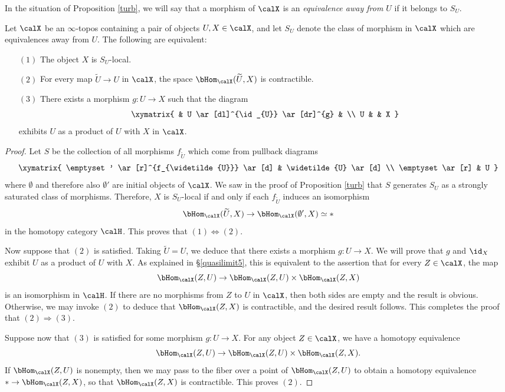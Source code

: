 In the situation of Proposition \ref{turb}, we will say that a morphism of $\calX$ is an {\it equivalence away from $U$} if it belongs to $S_{U}$.

\begin{lemma}\label{charclosedtub}
Let $\calX$ be an $\infty$-topos containing a pair of objects $U,X \in \calX$, and let $S_{U}$ denote the class of morphism in $\calX$ which are equivalences away from $U$. The following are equivalent:
\begin{itemize}
\item[$(1)$] The object $X$ is $S_{U}$-local.
\item[$(2)$] For every map $\widetilde{U} \rightarrow U$ in $\calX$, the space
$\bHom_{\calX}(\widetilde{U}, X)$ is contractible.
\item[$(3)$] There exists a morphism $g: U \rightarrow X$ such that the diagram
$$ \xymatrix{ & U \ar[dl]^{\id_{U}} \ar[dr]^{g} & \\
U & & X }$$
exhibits $U$ as a product of $U$ with $X$ in $\calX$.
\end{itemize}
\end{lemma}

\begin{proof}
Let $S$ be the collection of all morphisms $f_{\widetilde{U}}$ which come from pullback diagrams
$$ \xymatrix{ \emptyset' \ar[r]^{f_{\widetilde{U}}} \ar[d] & \widetilde{U} \ar[d] \\
\emptyset \ar[r] & U }$$
where $\emptyset$ and therefore also $\emptyset'$ are initial objects of $\calX$. We saw in the proof of Proposition \ref{turb} that $S$ generates $S_{U}$ as a strongly saturated class of morphisms. Therefore, $X$ is $S_{U}$-local if and only if each $f_{\widetilde{U}}$ induces
an isomorphism
$$ \bHom_{\calX}( \widetilde{U} , X) \rightarrow \bHom_{\calX}( \emptyset', X) \simeq \ast$$
in the homotopy category $\calH$. This proves that $(1) \Leftrightarrow (2)$.

Now suppose that $(2)$ is satisfied. Taking $\widetilde{U}  = U$, we deduce that there exists a morphism $g: U \rightarrow X$. We will prove that $g$ and $\id_{X}$ exhibit $U$ as a product of $U$ with $X$. As explained in \S \ref{quasilimit5}, this is equivalent to the assertion that for every $Z \in \calX$, the map
$$ \bHom_{\calX}(Z,U) \rightarrow \bHom_{\calX}(Z,U) \times \bHom_{\calX}(Z,X)$$ is an isomorphism in $\calH$. If there are no morphisms from $Z$ to $U$ in $\calX$, then both sides are empty and the result is obvious. Otherwise, we may invoke $(2)$ to deduce that
$\bHom_{\calX}(Z,X)$ is contractible, and the desired result follows. This completes the proof that $(2) \Rightarrow (3)$.

Suppose now that $(3)$ is satisfied for some morphism $g: U \rightarrow X$. For any object
$Z \in \calX$, we have a homotopy equivalence
$$ \bHom_{\calX}(Z,U) \rightarrow \bHom_{\calX}(Z,U) \times \bHom_{\calX}(Z,X).$$
If $\bHom_{\calX}(Z,U)$ is nonempty, then we may pass to the fiber over a point
of $\bHom_{\calX}(Z,U)$ to obtain a homotopy equivalence $\ast \rightarrow \bHom_{\calX}(Z,X)$, so that $\bHom_{\calX}(Z,X)$ is contractible. This proves $(2)$.
\end{proof}

